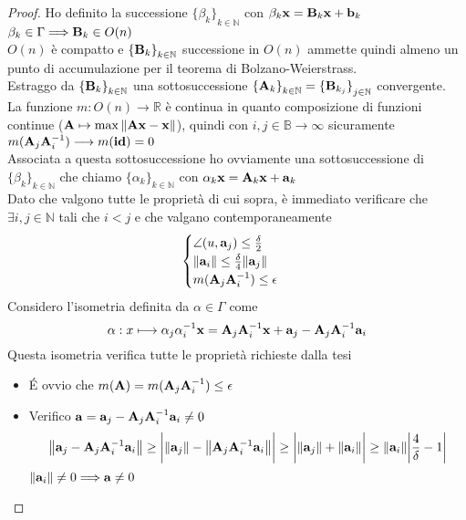\documentclass[10pt,a4paper]{book}
\begin{document}
\begin{proof}
Ho definito la successione ${ \{\beta_k \}}_{k \in \mathbb{N}}$  con  $\beta_k \vb{x = B}_k \vb{x + b}_k$   $\beta_k \in \Gamma \Longrightarrow \vb{B}_k \in O(n)$  \\
$O(n)$  è compatto e ${ \{\vb{B}_k \} }_{k \in \mathbb{N}}$ successione in  $O(n)$  ammette quindi almeno un punto di accumulazione per il teorema di Bolzano-Weierstrass. \\
Estraggo da ${ \{ \vb{B}_k \}}_{k \in \mathbb{N}}$  una sottosuccessione  $ { \{ \vb{A}_k \} }_{k \in \mathbb{N}} = { \{ \vb{B}_{k_j} \} }_{j \in \mathbb{N}}$  convergente.  \\
La funzione  $ m: O(n) \longrightarrow \mathbb{R}$  è continua in quanto composizione di funzioni continue ($ \vb{A} \mapsto \max{\norm{\vb{Ax-x}}} $), quindi con $i,j \in \mathbb{B} \longrightarrow \infty $ sicuramente $m(\vb{A}_j \vb{A}^{-1}_i) \longrightarrow m(\vb{id}) = 0 $ \\
Associata a questa sottosuccessione ho ovviamente una sottosuccessione di ${ \{\beta_k \}}_{k \in \mathbb{N}}$ che chiamo ${ \{\alpha_k \}}_{k \in \mathbb{N}}$ con  $\alpha_k \vb{x = A}_k \vb{x + a}_k$ \\


Dato che valgono tutte le proprietà di cui sopra, è immediato verificare che $\exists i,j \in \mathbb{N} $  tali che  $ i < j$  e che valgano contemporaneamente
\[ \begin{cases} \angle(u, \vb{a}_j ) \leq \frac{\delta}{2} \\
\norm{\vb{a}_i} \leq \frac{\delta}{4}\norm{\vb{a}_j} \\
m( \vb{A}_j \vb{A}^{-1}_i ) \leq \epsilon  \end{cases} \]
Considero l'isometria definita da $\alpha \in \Gamma$ come 
\[ \alpha : x \longmapsto \alpha_j \alpha^{-1}_i \vb{x} = \vb{A}_j \vb{A}^{-1}_i \vb{x} + \vb{a}_j - \vb{A}_j \vb{A}^{-1}_i \vb{a}_i\]
Questa isometria verifica tutte le proprietà richieste dalla tesi

\begin{itemize}
\item \'E ovvio che $m(\vb{A}) = m(\vb{A}_j \vb{A}^{-1}_i) \leq \epsilon$ 
\item Verifico  $\vb{a}= \vb{a}_j - \vb{A}_j \vb{A}^{-1}_i \vb{a}_i \neq 0$ 
\[ \norm{\vb{a}_j - \vb{A}_j \vb{A}^{-1}_i \vb{a}_i} \geq \bigg| \norm{\vb{a}_j} - \norm{ \vb{A}_j \vb{A}^{-1}_i \vb{a}_i } \bigg| \geq \bigg| \norm{\vb{a}_j } + \norm{\vb{a}_i} \bigg| \geq \norm{\vb{a}_i} \bigg| \frac{4}{\delta} -1 \bigg| \]
$\norm{\vb{a}_i} \neq 0 \Longrightarrow \vb{a} \neq 0$
 

\end{itemize}
\end{proof}
\end{document}

